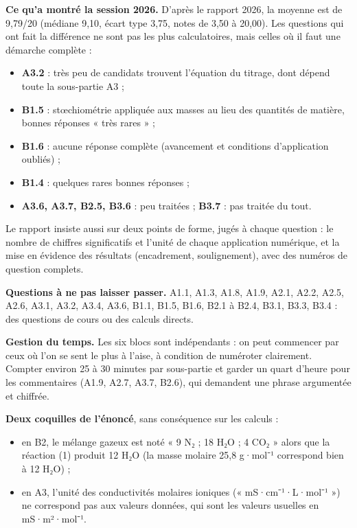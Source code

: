 \documentclass[11pt,a4paper]{article}
\providecommand{\tightlist}{\setlength{\itemsep}{0pt}\setlength{\parskip}{0pt}}
\begin{document}
\textbf{Ce qu'a montré la session 2026.} D'après le rapport 2026, la moyenne est de 9,79/20 (médiane 9,10, écart type 3,75, notes de 3,50 à 20,00). Les questions qui ont fait la différence ne sont pas les plus calculatoires, mais celles où il faut une démarche complète :

\begin{itemize}
\tightlist
\item
  \textbf{A3.2} : très peu de candidats trouvent l'équation du titrage, dont dépend toute la sous-partie A3 ;
\item
  \textbf{B1.5} : stœchiométrie appliquée aux masses au lieu des quantités de matière, bonnes réponses « très rares » ;
\item
  \textbf{B1.6} : aucune réponse complète (avancement et conditions d'application oubliés) ;
\item
  \textbf{B1.4} : quelques rares bonnes réponses ;
\item
  \textbf{A3.6, A3.7, B2.5, B3.6} : peu traitées ; \textbf{B3.7} : pas traitée du tout.
\end{itemize}

Le rapport insiste aussi sur deux points de forme, jugés à chaque question : le nombre de chiffres significatifs et l'unité de chaque application numérique, et la mise en évidence des résultats (encadrement, soulignement), avec des numéros de question complets.

\textbf{Questions à ne pas laisser passer.} A1.1, A1.3, A1.8, A1.9, A2.1, A2.2, A2.5, A2.6, A3.1, A3.2, A3.4, A3.6, B1.1, B1.5, B1.6, B2.1 à B2.4, B3.1, B3.3, B3.4 : des questions de cours ou des calculs directs.

\textbf{Gestion du temps.} Les six blocs sont indépendants : on peut commencer par ceux où l'on se sent le plus à l'aise, à condition de numéroter clairement. Compter environ 25 à 30 minutes par sous-partie et garder un quart d'heure pour les commentaires (A1.9, A2.7, A3.7, B2.6), qui demandent une phrase argumentée et chiffrée.

\textbf{Deux coquilles de l'énoncé}, sans conséquence sur les calculs :

\begin{itemize}
\tightlist
\item
  en B2, le mélange gazeux est noté « 9 N₂ ; 18 H₂O ; 4 CO₂ » alors que la réaction (1) produit 12 H₂O (la masse molaire 25,8 g·mol⁻¹ correspond bien à 12 H₂O) ;
\item
  en A3, l'unité des conductivités molaires ioniques (« mS·cm⁻¹·L·mol⁻¹ ») ne correspond pas aux valeurs données, qui sont les valeurs usuelles en mS·m²·mol⁻¹.
\end{itemize}
\end{document}
